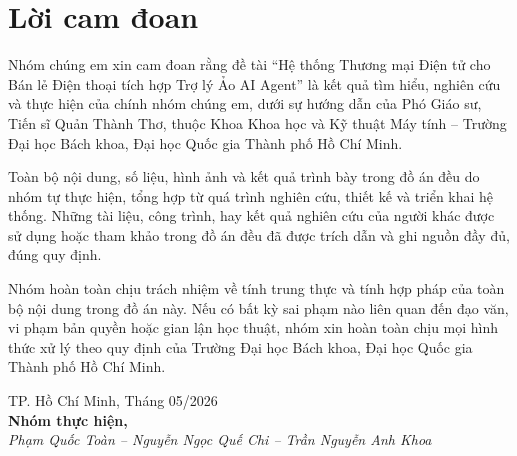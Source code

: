 \section*{Lời cam đoan}
\thispagestyle{empty}

Nhóm chúng em xin cam đoan rằng đề tài “Hệ thống Thương mại Điện tử cho Bán lẻ Điện thoại tích hợp Trợ lý Ảo AI Agent” là kết quả tìm hiểu, nghiên cứu và thực hiện của chính nhóm chúng em, dưới sự hướng dẫn của Phó Giáo sư, Tiến sĩ Quản Thành Thơ, thuộc Khoa Khoa học và Kỹ thuật Máy tính – Trường Đại học Bách khoa, Đại học Quốc gia Thành phố Hồ Chí Minh.

Toàn bộ nội dung, số liệu, hình ảnh và kết quả trình bày trong đồ án đều do nhóm tự thực hiện, tổng hợp từ quá trình nghiên cứu, thiết kế và triển khai hệ thống. Những tài liệu, công trình, hay kết quả nghiên cứu của người khác được sử dụng hoặc tham khảo trong đồ án đều đã được trích dẫn và ghi nguồn đầy đủ, đúng quy định.

Nhóm hoàn toàn chịu trách nhiệm về tính trung thực và tính hợp pháp của toàn bộ nội dung trong đồ án này. Nếu có bất kỳ sai phạm nào liên quan đến đạo văn, vi phạm bản quyền hoặc gian lận học thuật, nhóm xin hoàn toàn chịu mọi hình thức xử lý theo quy định của Trường Đại học Bách khoa, Đại học Quốc gia Thành phố Hồ Chí Minh.

\vspace{1cm}

\begin{flushright}
TP. Hồ Chí Minh, Tháng 05/2026\\[0.4cm]
\textbf{Nhóm thực hiện,}\\[0.3cm]
\textit{Phạm Quốc Toàn -- Nguyễn Ngọc Quế Chi -- Trần Nguyễn Anh Khoa}
\end{flushright}

\clearpage
{}

